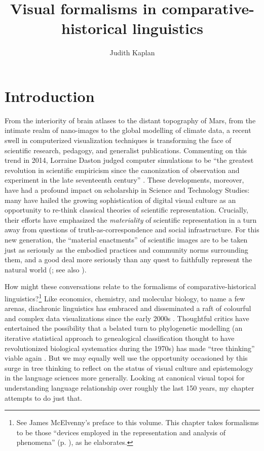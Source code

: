 \documentclass[output=paper]{langscibook}
\author{Judith Kaplan\affiliation{University of Pennsylvania}}
\title{Visual formalisms in comparative-historical linguistics}
\begin{document}
\maketitle

\section{Introduction}
\label{sec:kaplan:intro}

From the interiority of brain atlases to the distant topography of Mars, from the intimate realm of nano-images to the global modelling of climate data, a recent swell in  computerized visualization techniques is transforming the face of scientific research, pedagogy, and generalist publications. Commenting on this trend in 2014, Lorraine Daston judged computer simulations to be ``the greatest revolution in scientific empiricism since the canonization of observation and experiment in the late seventeenth century'' \citep[321]{Daston2014}. These developments, moreover, have had a profound impact on scholarship in Science and Technology Studies: many have hailed the growing sophistication of digital visual culture as an opportunity to re-think classical theories of scientific representation. Crucially, their efforts have emphasized the \emph{materiality} of scientific representation in a turn away from questions of truth-as-correspondence and social infrastructure. For this new generation, the ``material enactments'' of scientific images are to be taken just as seriously as the embodied practices and community norms surrounding them, and a good deal more seriously than any quest to faithfully represent the natural world (\citealt[3]{Coopmansetal2014}; see also \citealt{Kusukawa2016}).

How might these conversations relate to the formalisms of comparative-his\-tor\-i\-cal linguistics?\footnote{See James McElvenny's preface to this volume. This chapter takes formalisms to be those ``devices employed in the representation and analysis of phenomena'' (p. \pageref{p:pref:devices}), as he elaborates.} Like economics, chemistry, and molecular biology, to name a few arenas, diachronic linguistics has embraced and disseminated a raft of colourful and complex data visualizations since the early 2000s \citep[see, e.g., ][]{GrayDrummondGreenhill2009}. Thoughtful critics have entertained the possibility that a belated turn to phylogenetic modelling (an iterative statistical approach to genealogical classification thought to have revolutionized biological systematics during the 1970s) has made ``tree thinking'' viable again \citep{Lopez2013}. But we may equally well use the opportunity occasioned by this surge in tree thinking to reflect on the status of visual culture and epistemology in the language sciences more generally. Looking at canonical visual topoi for understanding language relationship over roughly the last 150 years, my chapter attempts to do just that.
\end{document}
